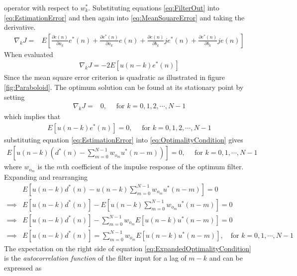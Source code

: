 operator with respect to $w_{k}^{*}$. Substituting equations %
\ref{eq:FilterOut} into \ref{eq:EstimationError} and then %
again into \ref{eq:MeanSquareError} and taking the derivative.
\begin{align}
	\nabla_{k}J =& E\left[ \frac{\partial e(n)}
	{\partial a_{k}} e^{*}(n) + \frac{\partial
	e^{*}(n)}{\partial a_{k}}e(n) + \frac{
	\partial e(n)}{\partial b_{k}}je^{*}(n) 
	+ \frac{\partial e^{*}(n)}{\partial b_{
	k}}je(n)\right] \label{eq:DerivativeJ}
\end{align}
When evaluated 
\begin{align}
	\nabla_{k}J = -2E\left[u(n-k)e^{*}(n)\right]
	\label{eq:CostDerivative}
\end{align}
Since the mean square error criterion is quadratic as illustrated %
in figure \ref{fig:Paraboloid}.
The optimum solution can be found at its stationary %
point by setting
\begin{align}
	\nabla_{k}J =& 0,\quad\text{ for } k=0,1,2,\cdots,N-1
\end{align}
which implies that
\begin{align}
	E\left[u(n-k)e^{*}(n)\right] = 0,\quad\text{ for } k = 0,1,2,\cdots,N-1
	\label{eq:OptimalityCondition}
\end{align}
substituting equation \ref{eq:EstimationError} into %
\ref{eq:OptimalityCondition} gives
\begin{align}
	E\left[u(n-k)\left(d^{*}(n) - \sum_{m=0}^{N-1}w_{o_{m}}u
	^{*}(n-m)\right)\right]=0,\quad\text{ for }k=0,1,\cdots,N-1
\end{align}
where $w_{o_{m}}$ is the $m\text{th}$ coefficient of %
the impulse response of the optimum filter. Expanding and %
rearranging
\begin{align}
	&E\left[u(n-k)d^{*}(n) - u(n-k)\sum_{m=0}^{N-1}w
	_{o_{m}}u^{*}(n-m)\right] = 0\\
	\implies &E\left[u(n-k)d^{*}(n)\right] - E\left[u(n-k)\sum
	_{m=0}^{N-1}w_{o_{m}}u^{*}(n-m)\right] = 0\\
	\implies &E\left[u(n-k)d^{*}(n)\right] - \sum_{m=0}^{N-1}
	w_{o_{m}}E\left[u(n-k)u^{*}(n-m)\right] = 0\\
	\implies &E\left[u(n-k)d^{*}(n)\right] = 
	\sum_{m=0}^{N-1}w_{o_{m}}E\left[u(n-k)u^{*}(
	n-m)\right],\quad\text{for }k=0,1,\cdots,N-1
	\label{eq:ExpandedOptimalityCondition}
\end{align}
The expectation on the right side of equation %
\ref{eq:ExpandedOptimalityCondition} is the %
\emph{autocorrelation function} of the filter input %
for a lag of $m-k$ and can be expressed as
